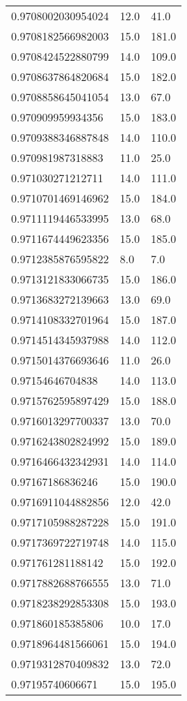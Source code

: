 \begin{center}
\begin{supertabular}[H]{p{0.30\textwidth}p{0.05\textwidth}p{0.05\textwidth}}
0.9708002030954024 & 12.0 & 41.0 \\ 
0.9708182566982003 & 15.0 & 181.0 \\ 
0.9708424522880799 & 14.0 & 109.0 \\ 
0.9708637864820684 & 15.0 & 182.0 \\ 
0.9708858645041054 & 13.0 & 67.0 \\ 
0.970909959934356 & 15.0 & 183.0 \\ 
0.9709388346887848 & 14.0 & 110.0 \\ 
0.970981987318883 & 11.0 & 25.0 \\ 
0.971030271212711 & 14.0 & 111.0 \\ 
0.9710701469146962 & 15.0 & 184.0 \\ 
0.9711119446533995 & 13.0 & 68.0 \\ 
0.9711674449623356 & 15.0 & 185.0 \\ 
0.9712385876595822 & 8.0 & 7.0 \\ 
0.9713121833066735 & 15.0 & 186.0 \\ 
0.9713683272139663 & 13.0 & 69.0 \\ 
0.9714108332701964 & 15.0 & 187.0 \\ 
0.9714514345937988 & 14.0 & 112.0 \\ 
0.9715014376693646 & 11.0 & 26.0 \\ 
0.97154646704838 & 14.0 & 113.0 \\ 
0.9715762595897429 & 15.0 & 188.0 \\ 
0.9716013297700337 & 13.0 & 70.0 \\ 
0.9716243802824992 & 15.0 & 189.0 \\ 
0.9716466432342931 & 14.0 & 114.0 \\ 
0.97167186836246 & 15.0 & 190.0 \\ 
0.9716911044882856 & 12.0 & 42.0 \\ 
0.9717105988287228 & 15.0 & 191.0 \\ 
0.9717369722719748 & 14.0 & 115.0 \\ 
0.971761281188142 & 15.0 & 192.0 \\ 
0.9717882688766555 & 13.0 & 71.0 \\ 
0.9718238292853308 & 15.0 & 193.0 \\ 
0.971860185385806 & 10.0 & 17.0 \\ 
0.9718964481566061 & 15.0 & 194.0 \\ 
0.9719312870409832 & 13.0 & 72.0 \\ 
0.97195740606671 & 15.0 & 195.0 \\ 

\end{supertabular}
\end{center}
